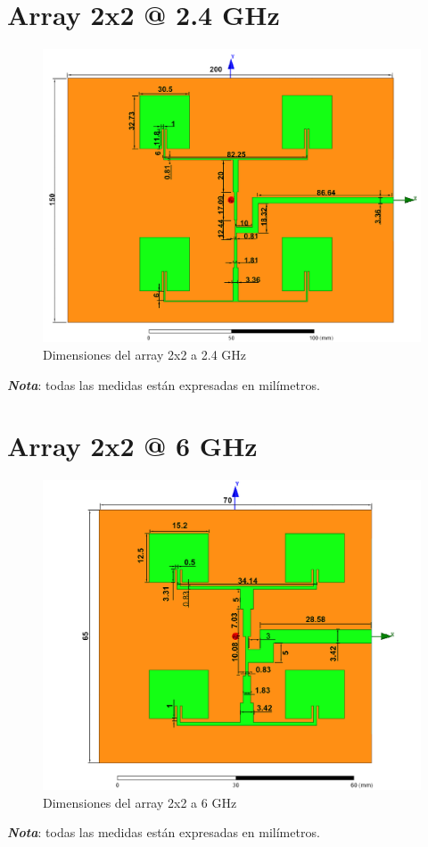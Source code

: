 \section{Array 2x2 @ 2.4 GHz}
\vfill
\begin{figure}[H]
   	 \centering
        \includegraphics[width=\textwidth ,height=\textheight, keepaspectratio=true]{archivos/desarrollo/autocad/7}
        \caption{Dimensiones del array 2x2 a 2.4 GHz}
        \label{fig:2x21}
\end{figure}
\vfill
\textit{\textbf{Nota}}: todas las medidas están expresadas en milímetros.
\newpage

\section{Array 2x2 @ 6 GHz}
\vfill
\begin{figure}[H]
   	 \centering
        \includegraphics[width=\textwidth ,height=\textheight, keepaspectratio=true]{archivos/desarrollo/autocad/8}
        \caption{Dimensiones del array 2x2 a 6 GHz}
        \label{fig:2x22}
\end{figure}
\vfill
\textit{\textbf{Nota}}: todas las medidas están expresadas en milímetros.
\newpage

